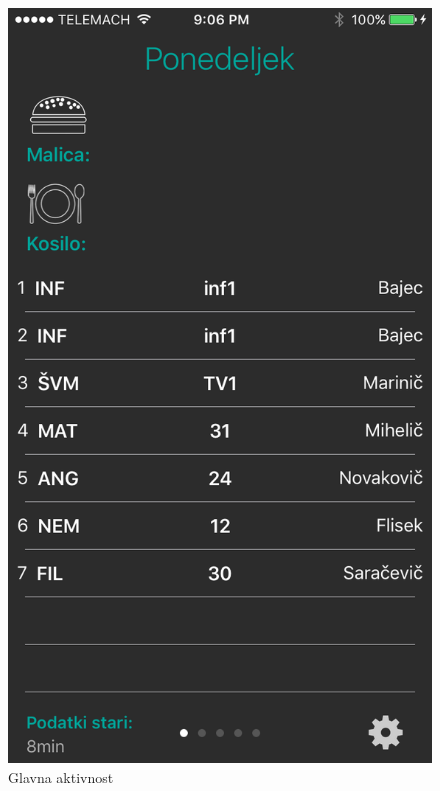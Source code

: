 \begin{figure}[!h]
	\begin{minipage}{0.45\linewidth}
		\includegraphics[width=\linewidth]{images/main_view.png}
		\caption{Glavna aktivnost}\label{fig:main_view}
	\end{minipage}\hfill
	\begin{minipage}{0.45\linewidth}

\end{minipage}
\end{figure}
